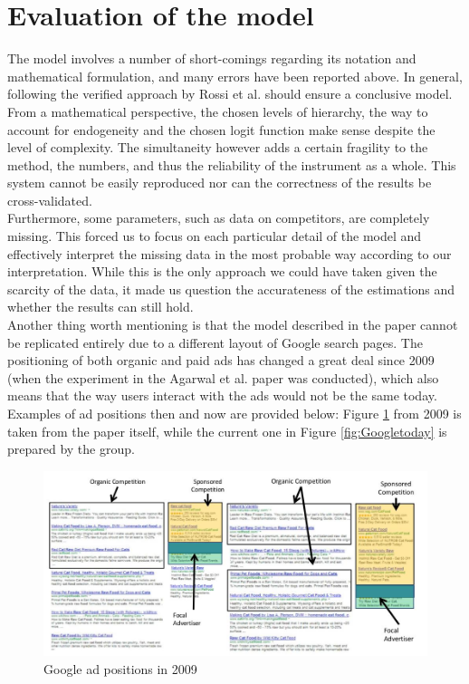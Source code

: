 \section{Evaluation of the model}
The model involves a number of short-comings regarding its notation and mathematical formulation, and many errors have been reported above. In general, following the verified approach by Rossi et al. should ensure a conclusive model. From a mathematical perspective, the chosen levels of hierarchy, the way to account for endogeneity and the chosen logit function make sense despite the level of complexity. The simultaneity however adds a certain fragility to the method, the numbers, and thus the reliability of the instrument as a whole. This system cannot be easily reproduced nor can the correctness of the results be cross-validated.\\
Furthermore, some parameters, such as data on competitors, are completely missing. This forced us to focus on each particular detail of the model and effectively interpret the missing data in the most probable way according to our interpretation. While this is the only approach we could have taken given the scarcity of the data, it made us question the accurateness of the estimations and whether the results can still hold.\\
Another thing worth mentioning is that the model described in the paper cannot be replicated entirely due to a different layout of Google search pages. The positioning of both organic and paid ads has changed a great deal since 2009 (when the experiment in the Agarwal et al. paper was conducted), which also means that the way users interact with the ads would not be the same today. Examples of ad positions then and now are provided below: Figure \ref{fig:Google2009} from 2009 is taken from the paper itself, while the current one in Figure \ref{fig:Googletoday} is prepared by the group.\\

\begin{figure}
    \includegraphics[scale=0.35]{organic_vs_sponsored.jpeg}
    \caption{Google ad positions in 2009}
    \label{fig:Google2009}
\end{figure}


